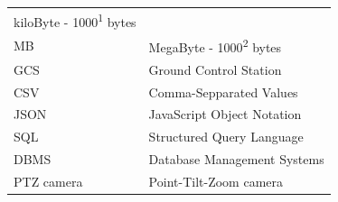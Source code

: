 \documentclass[12pt,oneside]{reedthesis}
\theoremstyle{definition}
\theoremstyle{definition}
\theoremstyle{definition}
\theoremstyle{remark}
\begin{document}
\begin{abbrvs}
\begin{longtable}[]{@{}ll@{}}
\begin{minipage}[t]{0.41\columnwidth}
    kiloByte - 1000\textsuperscript{1} bytes\strut
    \end{minipage}\tabularnewline
    \begin{minipage}[t]{0.26\columnwidth}\raggedright\strut
    MB\strut
    \end{minipage} & \begin{minipage}[t]{0.41\columnwidth}\raggedright\strut
    MegaByte - 1000\textsuperscript{2} bytes\strut
    \end{minipage}\tabularnewline
    \begin{minipage}[t]{0.26\columnwidth}\raggedright\strut
    GCS\strut
    \end{minipage} & \begin{minipage}[t]{0.41\columnwidth}\raggedright\strut
    Ground Control Station\strut
    \end{minipage}\tabularnewline
    \begin{minipage}[t]{0.26\columnwidth}\raggedright\strut
    CSV\strut
    \end{minipage} & \begin{minipage}[t]{0.41\columnwidth}\raggedright\strut
    Comma-Sepparated Values\strut
    \end{minipage}\tabularnewline
    \begin{minipage}[t]{0.26\columnwidth}\raggedright\strut
    JSON\strut
    \end{minipage} & \begin{minipage}[t]{0.41\columnwidth}\raggedright\strut
    JavaScript Object Notation\strut
    \end{minipage}\tabularnewline
    \begin{minipage}[t]{0.26\columnwidth}\raggedright\strut
    SQL\strut
    \end{minipage} & \begin{minipage}[t]{0.41\columnwidth}\raggedright\strut
    Structured Query Language\strut
    \end{minipage}\tabularnewline
    \begin{minipage}[t]{0.26\columnwidth}\raggedright\strut
    DBMS\strut
    \end{minipage} & \begin{minipage}[t]{0.41\columnwidth}\raggedright\strut
    Database Management Systems\strut
    \end{minipage}\tabularnewline
    \begin{minipage}[t]{0.26\columnwidth}\raggedright\strut
    PTZ camera\strut
    \end{minipage} & \begin{minipage}[t]{0.41\columnwidth}\raggedright\strut
    Point-Tilt-Zoom camera\strut
    \end{minipage}\tabularnewline
    \bottomrule
    \end{longtable}
  \end{abbrvs}
  \hypersetup{linkcolor=black}
  \setcounter{tocdepth}{2}
  \tableofcontents
\end{document}
